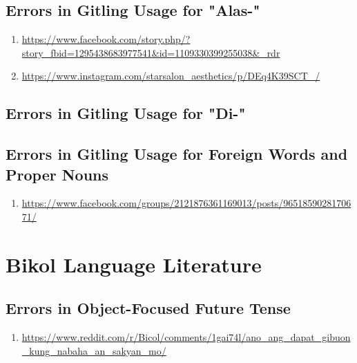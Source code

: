 \subsection{Errors in Gitling Usage for "Alas-"}

\begin{enumerate}
    \item \url{https://www.facebook.com/story.php/?story_fbid=1295438683977541&id=1109330399255038&_rdr} \\
    \item \url{https://www.instagram.com/starsalon_aesthetics/p/DEq4K39SCT_/} \\
\end{enumerate}

\subsection{Errors in Gitling Usage for "Di-"}
\subsection{Errors in Gitling Usage for Foreign Words and Proper Nouns}

\begin{enumerate}
    \item \url{https://www.facebook.com/groups/2121876361169013/posts/9651859028170671/} \\
\end{enumerate}


\section{Bikol Language Literature}

\subsection{Errors in Object-Focused Future Tense}
\begin{enumerate}
    \item \url{https://www.reddit.com/r/Bicol/comments/1gai74l/ano_ang_dapat_gibuon_kung_nabaha_an_sakyan_mo/} \\ 
\end{enumerate}

